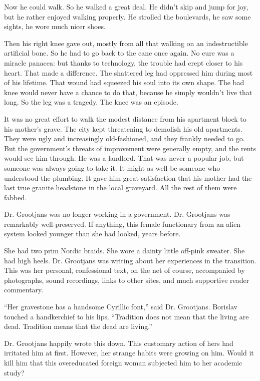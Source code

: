 \documentclass[20 pt,twoside,extrafontsizes,final]{memoir}
\begin{document}
Now he could walk. So he walked a great deal. He didn't skip and jump for joy, but he rather enjoyed walking properly. He strolled the boulevards, he saw some sights, he wore much nicer shoes.

Then his right knee gave out, mostly from all that walking on an indestructible artificial bone. So he had to go back to the cane once again. No cure was a miracle panacea: but thanks to technology, the trouble had crept closer to his heart. That made a difference. The shattered leg had oppressed him during most of his lifetime. That wound had squeezed his soul into its own shape. The bad knee would never have a chance to do that, because he simply wouldn't live that long. So the leg was a tragedy. The knee was an episode.

It was no great effort to walk the modest distance from his apartment block to his mother's grave. The city kept threatening to demolish his old apartments. They were ugly and increasingly old-fashioned, and they frankly needed to go. But the government's threats of improvement were generally empty, and the rents would see him through. He was a landlord. That was never a popular job, but someone was always going to take it. It might as well be someone who understood the plumbing. It gave him great satisfaction that his mother had the last true granite headstone in the local graveyard. All the rest of them were fabbed.

Dr. Grootjans was no longer working in a government. Dr. Grootjans was remarkably well-preserved. If anything, this female functionary from an alien system looked younger than she had looked, years before.

She had two prim Nordic braids. She wore a dainty little off-pink sweater. She had high heels. Dr. Grootjans was writing about her experiences in the transition. This was her personal, confessional text, on the net of course, accompanied by photographs, sound recordings, links to other sites, and much supportive reader commentary.

``Her gravestone has a handsome Cyrillic font,'' said Dr. Grootjans. Borislav touched a handkerchief to his lips. ``Tradition does not mean that the living are dead. Tradition means that the dead are living.''

Dr. Grootjans happily wrote this down. This customary action of hers had irritated him at first.
However, her strange habits were growing on him. Would it kill him that this overeducated foreign woman subjected him to her academic study?
\end{document}
